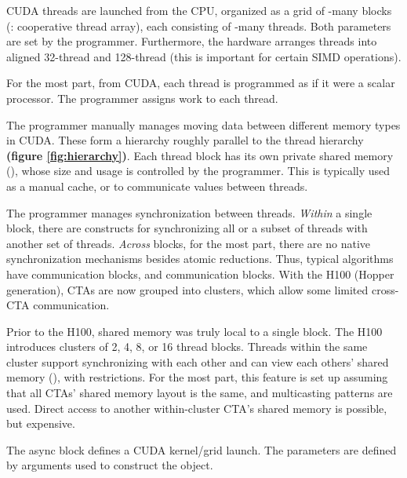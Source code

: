 \filbreak
{} CUDA threads are launched from the CPU, organized as a grid of -many blocks (: cooperative thread array), each consisting of -many threads.
Both parameters are set by the programmer.
Furthermore, the hardware arranges threads into aligned 32-thread  and 128-thread  (this is important for certain SIMD operations).

\filbreak
{} For the most part, from CUDA, each thread is programmed as if it were a scalar processor.
The programmer assigns work to each thread.

\filbreak
{} The programmer manually manages moving data between different memory types in CUDA.
These form a hierarchy roughly parallel to the thread hierarchy \textbf{(figure \ref{fig:hierarchy})}.
Each thread block has its own private shared memory (), whose size and usage is controlled by the programmer.
This is typically used as a manual cache, or to communicate values between threads.

\filbreak
{}
  The programmer manages synchronization between threads.
  \textit{Within} a single block, there are constructs for synchronizing all or a subset of threads with another set of threads.
  \textit{Across} blocks, for the most part, there are no native synchronization mechanisms besides atomic reductions.
  Thus, typical algorithms have  communication  blocks, and  communication  blocks.
  With the H100 (Hopper generation), CTAs are now grouped into clusters, which allow some limited cross-CTA communication.

\filbreak
{}

Prior to the H100, shared memory was truly local to a single block.
The H100 introduces clusters of 2, 4, 8, or 16 thread blocks.
Threads within the same cluster support synchronizing with each other and can view each others' shared memory (), with restrictions.
For the most part, this feature is set up assuming that all CTAs' shared memory layout is the same, and multicasting patterns are used.
Direct access to another within-cluster CTA's shared memory is possible, but expensive.

\filbreak
{}

The  async block defines a CUDA kernel/grid launch.
The parameters are defined by arguments used to construct the  object.

